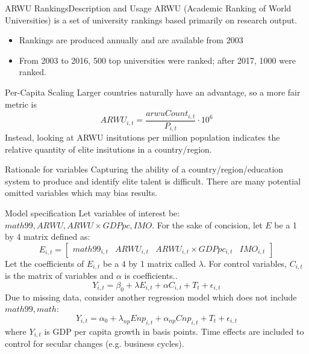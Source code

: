 \documentclass[10pt]{beamer}
\begin{document}
\begin{frame}{ARWU Rankings}{Description and Usage}
    ARWU (Academic Ranking of World Universities) is a set of university rankings based primarily on research output.
    \begin{itemize}
        \item Rankings are produced annually and are available from 2003
        \item From 2003 to 2016, 500 top universities were ranked; after 2017, 1000 were ranked.
    \end{itemize}
    
    \begin{block}{Per-Capita Scaling}
        Larger countries naturally have an advantage, so a more fair metric is
        \[ARWU_{i,t} = \frac{arwuCount_{i,t}}{P_{i,t}} \cdot 10^6 \]
        Instead, looking at ARWU insitutions per million population indicates the relative quantity of elite insitutions in a country/region.
    \end{block}
    
\end{frame}

\begin{frame}{Rationale for variables}
    Capturing the ability of a country/region/education system to produce and identify elite talent is difficult. There are many potential omitted variables which may bias results.
\end{frame}

\begin{frame}{Model specification}
    Let variables of interest be: $math99, ARWU, ARWU \times GDPpc, IMO$.
    For the sake of concision, let $E$ be a 1 by 4 matrix defined as:
    \[E_{i,t} = 
    \begin{bmatrix}
        math99_{i, t} & ARWU_{i, t} & ARWU_{i, t} \times GDPpc_{i, t} & IMO_{i, t}
    \end{bmatrix}
    \]
    Let the coefficients of $E_{i, t}$ be a 4 by 1 matrix called $\lambda$. For control variables, $C_{i, t}$ is the matrix of variables and $\alpha$ is coefficients..
    \begin{equation}
        Y_{i, t} = \beta_0 + \lambda E_{i, t} + \alpha C_{i, t} + T_t + \epsilon_{i, t}
    \end{equation}
    Due to missing data, consider another regression model which does not include $math99, math$:
    \begin{equation}
        Y_{i, t} = \alpha_0 + \lambda_{np} Enp_{i, t} + \alpha_{np} Cnp_{i, t} + T_t + \epsilon_{i, t}
    \end{equation}
    where $Y_{i,t}$ is GDP per capita growth in basis points. Time effects are included to control for secular changes (e.g. business cycles).
\end{frame}
\end{document}
